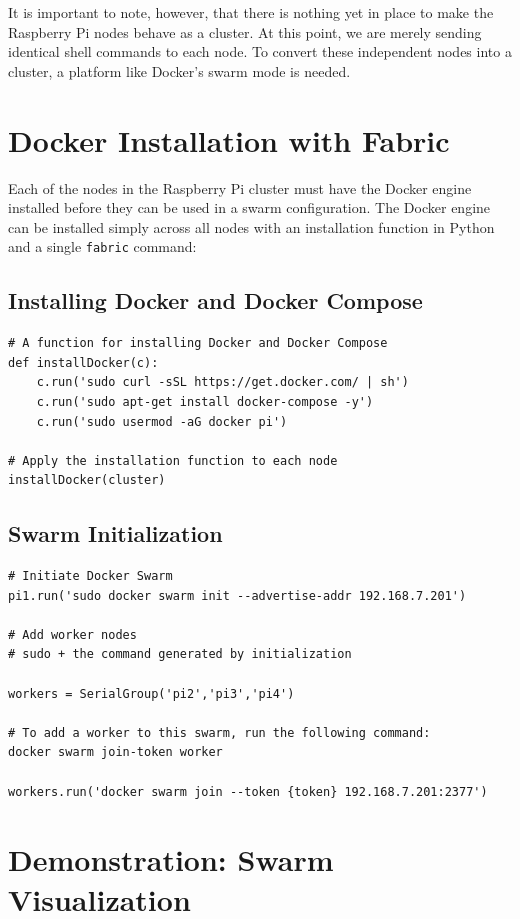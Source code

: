 \documentclass[sigconf]{acmart}
\begin{document}
\setlength{\parskip}{1em}\noindent It is important to note, however, that there is nothing yet in place to make the Raspberry Pi nodes behave as a cluster. At this point, we are merely sending identical shell commands to each node. To convert these independent nodes into a cluster, a platform like Docker's swarm mode is needed.

\section{Docker Installation with Fabric}
Each of the nodes in the Raspberry Pi cluster must have the Docker engine installed before they can be used in a swarm configuration\cite{swarmManual2018}. The Docker engine can be installed simply across all nodes with an installation function in Python and a single {\tt fabric} command:

\subsection{Installing Docker and Docker Compose}
\begin{lstlisting}
# A function for installing Docker and Docker Compose
def installDocker(c):
    c.run('sudo curl -sSL https://get.docker.com/ | sh')
    c.run('sudo apt-get install docker-compose -y')
    c.run('sudo usermod -aG docker pi')

# Apply the installation function to each node
installDocker(cluster)
\end{lstlisting}

\subsection{Swarm Initialization}
\begin{lstlisting}
# Initiate Docker Swarm
pi1.run('sudo docker swarm init --advertise-addr 192.168.7.201')

# Add worker nodes
# sudo + the command generated by initialization

workers = SerialGroup('pi2','pi3','pi4')

# To add a worker to this swarm, run the following command:
docker swarm join-token worker

workers.run('docker swarm join --token {token} 192.168.7.201:2377')
\end{lstlisting}

\section{Demonstration: Swarm Visualization}
\end{document}

